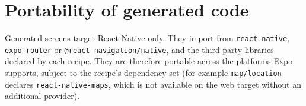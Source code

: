 \section{Portability of generated code}

Generated screens target React Native only. They import from \texttt{react-native},
\texttt{expo-router} or \texttt{@react-navigation/native}, and the third-party
libraries declared by each recipe. They are therefore portable across the platforms
Expo supports, subject to the recipe's dependency set (for example
\texttt{map/location} declares \texttt{react-native-maps}, which is not available
on the web target without an additional provider).
